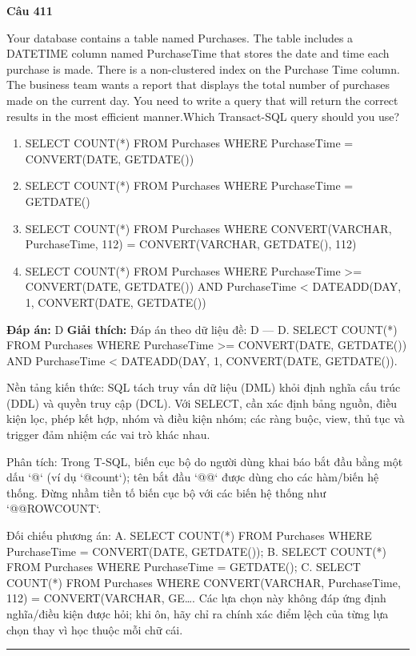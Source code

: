 \documentclass[11pt,a4paper]{article}
\newenvironment{question}[1]{%
  \par\vspace{1em}\noindent\textbf{\large Câu #1}\par\vspace{0.4em}
}{%
  \par\vspace{1em}\hrule\vspace{0.6em}
}
\newenvironment{choices}{%
  \begin{enumerate}[label=\textbf{\Alph*.},leftmargin=2.2em,itemsep=2pt,topsep=3pt]
}{%
  \end{enumerate}
}
\newcommand{\choice}{\item}
\begin{document}
\begin{question}{411}
Your database contains a table named Purchases. The table includes a DATETIME column named PurchaseTime that stores the date and time each purchase is made. There is a non-clustered index on the Purchase Time column. The business team wants a report that displays the total number of purchases made on the current day. You need to write a query that will return the correct results in the most efficient manner.Which Transact-SQL query should you use?
\begin{choices}
\choice SELECT COUNT(*) FROM Purchases WHERE PurchaseTime = CONVERT(DATE, GETDATE())
\choice SELECT COUNT(*) FROM Purchases WHERE PurchaseTime = GETDATE()
\choice SELECT COUNT(*) FROM Purchases WHERE CONVERT(VARCHAR, PurchaseTime, 112) = CONVERT(VARCHAR, GETDATE(), 112)
\choice SELECT COUNT(*) FROM Purchases WHERE PurchaseTime >= CONVERT(DATE, GETDATE()) AND PurchaseTime < DATEADD(DAY, 1, CONVERT(DATE, GETDATE())
\end{choices}
\textbf{Đáp án:} D
\textbf{Giải thích:} Đáp án theo dữ liệu đề: D — D. SELECT COUNT(*) FROM Purchases WHERE PurchaseTime >= CONVERT(DATE, GETDATE()) AND PurchaseTime < DATEADD(DAY, 1, CONVERT(DATE, GETDATE()).

Nền tảng kiến thức: SQL tách truy vấn dữ liệu (DML) khỏi định nghĩa cấu trúc (DDL) và quyền truy cập (DCL). Với SELECT, cần xác định bảng nguồn, điều kiện lọc, phép kết hợp, nhóm và điều kiện nhóm; các ràng buộc, view, thủ tục và trigger đảm nhiệm các vai trò khác nhau.

Phân tích: Trong T-SQL, biến cục bộ do người dùng khai báo bắt đầu bằng một dấu `@` (ví dụ `@count`); tên bắt đầu `@@` được dùng cho các hàm/biến hệ thống. Đừng nhầm tiền tố biến cục bộ với các biến hệ thống như `@@ROWCOUNT`.

Đối chiếu phương án: A. SELECT COUNT(*) FROM Purchases WHERE PurchaseTime = CONVERT(DATE, GETDATE()); B. SELECT COUNT(*) FROM Purchases WHERE PurchaseTime = GETDATE(); C. SELECT COUNT(*) FROM Purchases WHERE CONVERT(VARCHAR, PurchaseTime, 112) = CONVERT(VARCHAR, GE…. Các lựa chọn này không đáp ứng định nghĩa/điều kiện được hỏi; khi ôn, hãy chỉ ra chính xác điểm lệch của từng lựa chọn thay vì học thuộc mỗi chữ cái.
\end{question}
\end{document}
